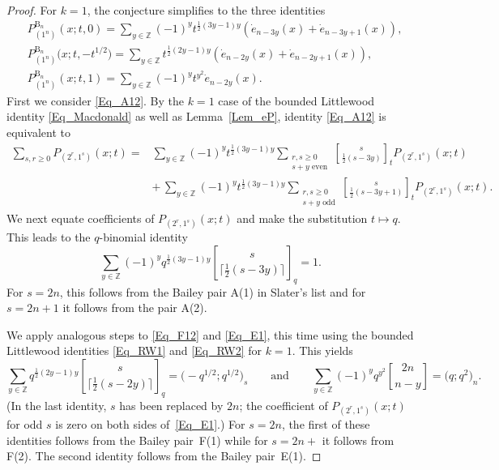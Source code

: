\documentclass[pdftex]{sigma}
\numberwithin{equation}{section}
\renewcommand{\geq}{\geqslant}
\newcommand{\ceil}[1]{\lceil#1\rceil}
\newcommand{\qbin}[2]{\genfrac{[}{]}{0pt}{}{#1}{#2}}
\begin{document}
\begin{proof}
For $k=1$, the conjecture simplifies to the three identities
\begin{subequations}
\begin{align}
\label{Eq_A12}
&P_{(1^n)}^{\mathrm{B}_n}(x;t,0)
=\sum_{y\in\mathbb{Z}} (-1)^y t^{\frac{1}{2}(3y-1)y}
(\dot{e}_{n-3y}(x)+\dot{e}_{n-3y+1}(x)), \\
\label{Eq_F12}
&P_{(1^n)}^{\mathrm{B}_n}\bigl(x;t,-t^{1/2}\bigr)
=\sum_{y\in\mathbb{Z}} t^{\frac{1}{2}(2y-1)y}
(\dot{e}_{n-2y}(x)+\dot{e}_{n-2y+1}(x)), \\
\label{Eq_E1}
&P_{(1^n)}^{\mathrm{B}_n}(x;t,1)
=\sum_{y\in\mathbb{Z}} (-1)^y t^{y^2} \dot{e}_{n-2y}(x).
\end{align}
\end{subequations}
First we consider \eqref{Eq_A12}.
By the $k=1$ case of the bounded Littlewood identity
\eqref{Eq_Macdonald} as well as Lemma~\ref{Lem_eP},
identity \eqref{Eq_A12} is equivalent to
\begin{align*}
\sum_{s,r\geq 0} P_{(2^r,1^s)}(x;t)
={}&\sum_{y\in\mathbb{Z}} (-1)^y t^{\frac{1}{2}(3y-1)y}
\sum_{\substack{r,s\geq 0\\[1pt] s+y \text{ even}}}
\qbin{s}{\frac{1}{2}(s-3y)}_t P_{(2^r,1^s)}(x;t) \\
&{+}\,\sum_{y\in\mathbb{Z}} (-1)^y t^{\frac{1}{2}(3y-1)y}
\sum_{\substack{r,s\geq 0\\[1pt] s+y \text{ odd}}}
\qbin{s}{\frac{1}{2}(s-3y+1)}_t P_{(2^r,1^s)}(x;t).
\end{align*}
We next equate coefficients of $P_{(2^r,1^s)}(x;t)$ and make the
substitution $t\mapsto q$.
This leads to the $q$-binomial identity
\[
\sum_{y\in\mathbb{Z}}
(-1)^y q^{\frac{1}{2}(3y-1)y} \qbin{s}{\ceil{\frac{1}{2}(s-3y)}}_q=1.
\]
For $s=2n$, this follows from the Bailey pair A(1) in Slater's list
and for $s=2n+1$ it follows from the pair A(2).

We apply analogous steps to \eqref{Eq_F12} and \eqref{Eq_E1},
this time using the bounded Littlewood identities
\eqref{Eq_RW1} and \eqref{Eq_RW2} for $k=1$.
This yields
\[
\sum_{y\in\mathbb{Z}} q^{\frac{1}{2}(2y-1)y}
\qbin{s}{\ceil{\frac{1}{2}(s-2y)}}_q
=\bigl({-}q^{1/2};q^{1/2}\bigr)_{\!s}
\qquad\text{and}\qquad
\sum_{y\in\mathbb{Z}} (-1)^y q^{y^2} \qbin{2n}{n-y}=\bigl(q;q^2\bigr)_{\!n}.
\]
(In the last identity, $s$ has been replaced by $2n$; the coefficient
of $P_{(2^r,1^s)}(x;t)$ for odd $s$ is zero on both sides of~\eqref{Eq_E1}.)
For $s=2n$, the first of these identities follows from the Bailey pair~F(1)
while for $s=2n+$ it follows from F(2).
The second identity follows from the Bailey pair~E(1).
\end{proof}
\end{document}
